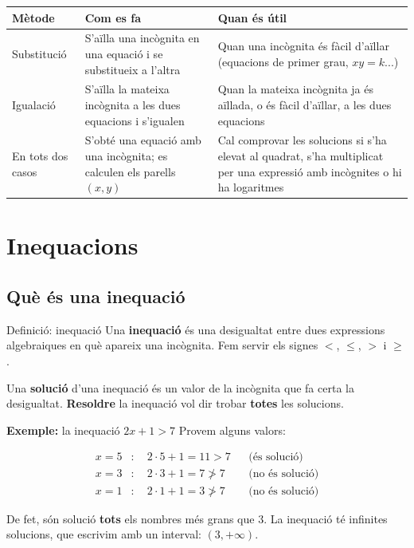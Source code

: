 \begin{center}
\begin{tabularx}{\linewidth}{lYY}
\toprule
\textbf{Mètode} & \textbf{Com es fa} & \textbf{Quan és útil} \\
\midrule
Substitució & S'aïlla una incògnita en una equació i se substitueix a l'altra & Quan una incògnita és fàcil d'aïllar (equacions de primer grau, $xy=k$...) \\
Igualació & S'aïlla la mateixa incògnita a les dues equacions i s'igualen & Quan la mateixa incògnita ja és aïllada, o és fàcil d'aïllar, a les dues equacions \\
En tots dos casos & S'obté una equació amb una incògnita; es calculen els parells $(x,y)$ & Cal comprovar les solucions si s'ha elevat al quadrat, s'ha multiplicat per una expressió amb incògnites o hi ha logaritmes \\
\bottomrule
\end{tabularx}
\end{center}

\section{Inequacions}

\subsection{Què és una inequació}

\begin{definicio}{Definició: inequació}
Una \textbf{inequació} és una desigualtat entre dues expressions algebraiques en què apareix una incògnita. Fem servir els signes $<$, $\leq$, $>$ i $\geq$.

Una \textbf{solució} d'una inequació és un valor de la incògnita que fa certa la desigualtat. \textbf{Resoldre} la inequació vol dir trobar \textbf{totes} les solucions.
\end{definicio}

\begin{exemple}{\textbf{Exemple:} la inequació $2x+1>7$}
Provem alguns valors:

\[
\begin{aligned}
x=5&:\quad 2\cdot 5+1=11>7 &&\text{(és solució)}\\
x=3&:\quad 2\cdot 3+1=7\not>7 &&\text{(no és solució)}\\
x=1&:\quad 2\cdot 1+1=3\not>7 &&\text{(no és solució)}
\end{aligned}
\]

De fet, són solució \textbf{tots} els nombres més grans que $3$. La inequació té infinites solucions, que escrivim amb un interval: $(3,+\infty)$.
\end{exemple}

